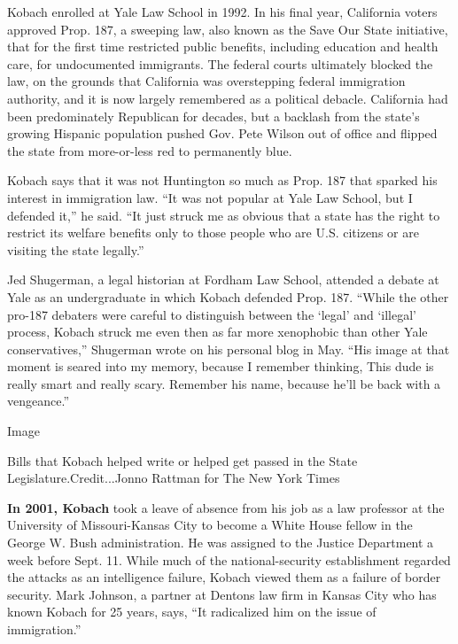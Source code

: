 Kobach enrolled at Yale Law School in 1992. In his final year,
California voters approved Prop. 187, a sweeping law, also known as the
Save Our State initiative, that for the first time restricted public
benefits, including education and health care, for undocumented
immigrants. The federal courts ultimately blocked the law, on the
grounds that California was overstepping federal immigration authority,
and it is now largely remembered as a political debacle. California had
been predominately Republican for decades, but a backlash from the
state's growing Hispanic population pushed Gov. Pete Wilson out of
office and flipped the state from more-or-less red to permanently blue.

Kobach says that it was not Huntington so much as Prop. 187 that sparked
his interest in immigration law. ``It was not popular at Yale Law
School, but I defended it,'' he said. ``It just struck me as obvious
that a state has the right to restrict its welfare benefits only to
those people who are U.S. citizens or are visiting the state legally.''

Jed Shugerman, a legal historian at Fordham Law School, attended a
debate at Yale as an undergraduate in which Kobach defended Prop. 187.
``While the other pro-187 debaters were careful to distinguish between
the `legal' and `illegal' process, Kobach struck me even then as far
more xenophobic than other Yale conservatives,'' Shugerman wrote on his
personal blog in May. ``His image at that moment is seared into my
memory, because I remember thinking, This dude is really smart and
really scary. Remember his name, because he'll be back with a
vengeance.''

Image

Bills that Kobach helped write or helped get passed in the State
Legislature.Credit...Jonno Rattman for The New York Times

\textbf{In 2001, Kobach} took a leave of absence from his job as a law
professor at the University of Missouri-Kansas City to become a White
House fellow in the George W. Bush administration. He was assigned to
the Justice Department a week before Sept. 11. While much of the
national-security establishment regarded the attacks as an intelligence
failure, Kobach viewed them as a failure of border security. Mark
Johnson, a partner at Dentons law firm in Kansas City who has known
Kobach for 25 years, says, ``It radicalized him on the issue of
immigration.''

